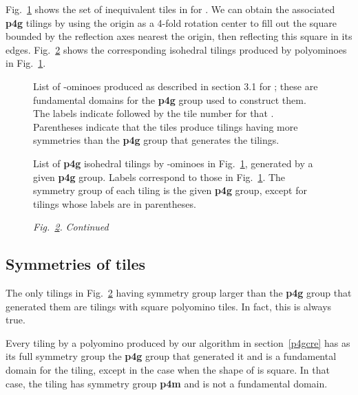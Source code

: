 \documentclass{ws-ijcga}
\begin{document}
Fig.~\ref{p4gfighi} shows the set of inequivalent tiles in  for . 
We can obtain the associated {\bf p4g} tilings by using the origin as a 4-fold rotation center to fill out the square
bounded by the reflection axes nearest the origin, then reflecting this square in its edges.
Fig.~\ref{p4gtiling} shows the corresponding isohedral tilings produced by polyominoes in Fig.~\ref{p4gfighi}.
\begin{figure}[h]
\centerline{}
\vspace*{8pt}
\caption{
List of -ominoes produced as described in section 3.1 for ; 
these are fundamental domains for
the {\bf p4g} group used to construct them. 
The labels indicate  followed by the tile number for that .
Parentheses indicate that the tiles produce tilings having more symmetries than the {\bf p4g} group that
generates the tilings.
\label{p4gfighi}
}
\end{figure}

\begin{figure}\centerline{}
\vspace*{8pt}
\caption{
List of {\bf p4g} isohedral tilings by -ominoes in Fig.~\ref{p4gfighi}, 
generated by a given {\bf p4g} group. 
Labels correspond to those in Fig.~\ref{p4gfighi}. 
The symmetry group of each tiling is the given {\bf p4g} group, 
except for tilings whose labels are in parentheses.
\label{p4gtiling}
}
\end{figure}
\begin{figure}\centerline{}
\vspace*{8pt}
    \fontsize{8pt}{0pt}\selectfont
    {\it Fig.~\ref{p4gtiling}.} {\it Continued}
\end{figure}




\subsection{Symmetries of tiles}
The only tilings in Fig.~\ref{p4gtiling} having symmetry group larger than the {\bf p4g} group  that generated
them are tilings with square polyomino tiles. 
In fact, this is always true.

\begin{theorem}
\label{th2}
Every tiling by a polyomino  produced by our algorithm in section~\ref{p4gcre} has as its
full symmetry group the {\bf p4g} group that generated it and  is a fundamental domain for the tiling,
except in the case when the shape of  is square. 
In that case, the tiling has symmetry group {\bf p4m} and  is not a fundamental domain.
\end{theorem}
\end{document}
